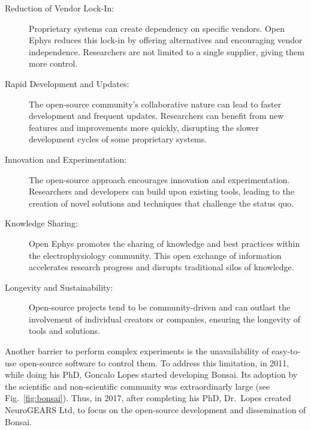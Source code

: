 {\begin{description}
	\item[Reduction of Vendor Lock-In:] Proprietary systems can create dependency on specific vendors. Open Ephys reduces this lock-in by offering alternatives and encouraging vendor independence. Researchers are not limited to a single supplier, giving them more control.

	\item[Rapid Development and Updates:] The open-source community's collaborative nature can lead to faster development and frequent updates. Researchers can benefit from new features and improvements more quickly, disrupting the slower development cycles of some proprietary systems.

	\item[Innovation and Experimentation:] The open-source approach encourages innovation and experimentation. Researchers and developers can build upon existing tools, leading to the creation of novel solutions and techniques that challenge the status quo.

	\item[Knowledge Sharing:] Open Ephys promotes the sharing of knowledge and best practices within the electrophysiology community. This open exchange of information accelerates research progress and disrupts traditional silos of knowledge.

	\item[Longevity and Sustainability:] Open-source projects tend to be community-driven and can outlast the involvement of individual creators or companies, ensuring the longevity of tools and solutions.

\end{description}

}

Another barrier to perform complex experiments is the unavailability of
easy-to-use open-source software to control them. To address this limitation,
in 2011, while doing his PhD, Goncalo Lopes started developing Bonsai. Its
adoption by the scientific and non-scientific community was extraordinarly
large (see Fig.~\ref{fig:bonsai}). Thus, in 2017, after completing his PhD,
Dr.~Lopes created NeuroGEARS Ltd, to focus on the open-source development and
dissemination of Bonsai.

